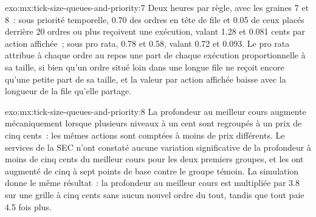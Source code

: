 \begin{solution}{exo:mx:tick-size-queues-and-priority:7}
Deux heures par règle, avec les graines 7 et 8~: sous priorité temporelle, 0.70 des ordres en tête de file et 0.05 de ceux placés derrière 20 ordres ou plus reçoivent une exécution, valant 1.28 et 0.081 cents
par action affichée~; sous pro rata, 0.78 et 0.58, valant 0.72 et 0.093. Le pro rata attribue à chaque ordre au repos une part de chaque exécution proportionnelle à sa taille,
si bien qu'un ordre situé loin dans une longue file ne reçoit encore qu'une petite part de sa taille, et la valeur par action affichée baisse avec la longueur de la file qu'elle
partage.
\end{solution}

\begin{solution}{exo:mx:tick-size-queues-and-priority:8}
La profondeur au meilleur cours augmente mécaniquement lorsque plusieurs niveaux à un cent sont regroupés à un prix de cinq cents~: les mêmes actions sont comptées à moins de prix différents. Le
services de la SEC n'ont constaté aucune variation significative de la profondeur à moins de cinq cents du meilleur cours pour les deux premiers groupes, et les  ont augmenté de cinq à sept points de base
contre le groupe témoin. La simulation donne le même résultat~: la profondeur au meilleur cours est multipliée par 3.8 sur une grille à cinq cents sans aucun nouvel ordre
du tout, tandis que tout  paie 4.5 fois plus.
\end{solution}

